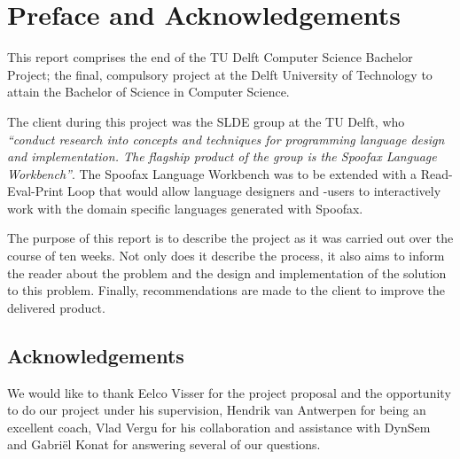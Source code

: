 \chapter{Preface and Acknowledgements}
\label{cha:preface-acks}

This report comprises the end of the TU Delft Computer Science Bachelor Project;
the final, compulsory project at the Delft University of Technology to attain
the Bachelor of Science in Computer Science.

The client during this project was the SLDE group at the TU Delft, who
\textit{``conduct research into concepts and techniques for programming language
design and implementation. The flagship product of the group is the Spoofax
Language Workbench''}. The Spoofax Language Workbench was to be extended with a
Read-Eval-Print Loop that would allow language designers and -users to
interactively work with the domain specific languages generated with Spoofax.

The purpose of this report is to describe the project as it was carried out over
the course of ten weeks. Not only does it describe the process, it also aims to
inform the reader about the problem and the design and implementation of the
solution to this problem. Finally, recommendations are made to the client to
improve the delivered product.

\section*{Acknowledgements}

We would like to thank Eelco Visser for the project proposal and the
opportunity to do our project under his supervision, Hendrik van Antwerpen for
being an excellent coach, Vlad Vergu for his collaboration and assistance with
DynSem and Gabri\"el Konat for answering several of our questions.

